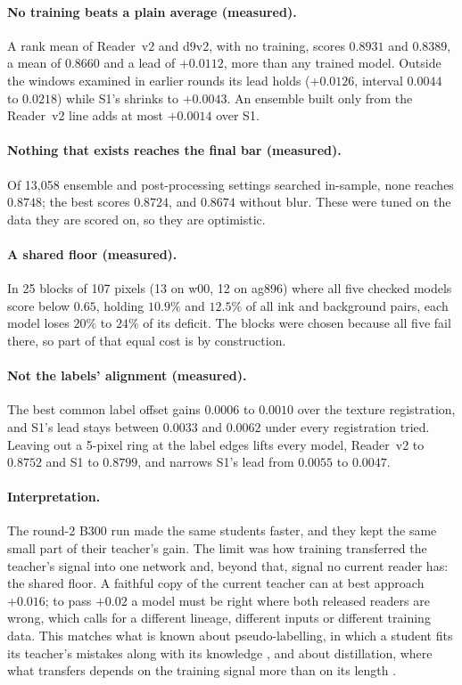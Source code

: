 \documentclass[11pt]{article}
\begin{document}
\paragraph{No training beats a plain average (measured).} A rank mean of Reader~v2 and d9v2, with no training, scores $0.8931$ and $0.8389$, a mean of $0.8660$ and a lead of $+0.0112$, more than any trained model. Outside the windows examined in earlier rounds its lead holds ($+0.0126$, interval $0.0044$ to $0.0218$) while S1's shrinks to $+0.0043$. An ensemble built only from the Reader~v2 line adds at most $+0.0014$ over S1.

\paragraph{Nothing that exists reaches the final bar (measured).} Of 13{,}058 ensemble and post-processing settings searched in-sample, none reaches $0.8748$; the best scores $0.8724$, and $0.8674$ without blur. These were tuned on the data they are scored on, so they are optimistic.

\paragraph{A shared floor (measured).} In 25 blocks of 107 pixels (13 on w00, 12 on ag896) where all five checked models score below $0.65$, holding $10.9\%$ and $12.5\%$ of all ink and background pairs, each model loses $20\%$ to $24\%$ of its deficit. The blocks were chosen because all five fail there, so part of that equal cost is by construction.

\paragraph{Not the labels' alignment (measured).} The best common label offset gains $0.0006$ to $0.0010$ over the texture registration, and S1's lead stays between $0.0033$ and $0.0062$ under every registration tried. Leaving out a 5-pixel ring at the label edges lifts every model, Reader~v2 to $0.8752$ and S1 to $0.8799$, and narrows S1's lead from $0.0055$ to $0.0047$.

\paragraph{Interpretation.} The round-2 B300 run made the same students faster, and they kept the same small part of their teacher's gain. The limit was how training transferred the teacher's signal into one network and, beyond that, signal no current reader has: the shared floor. A faithful copy of the current teacher can at best approach $+0.016$; to pass $+0.02$ a model must be right where both released readers are wrong, which calls for a different lineage, different inputs or different training data. This matches what is known about pseudo-labelling, in which a student fits its teacher's mistakes along with its knowledge \cite{arazo}, and about distillation, where what transfers depends on the training signal more than on its length \cite{hinton, noisystudent}.
\end{document}
